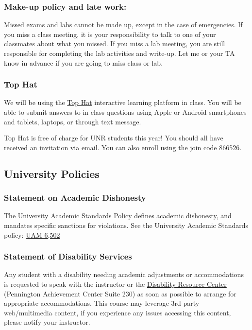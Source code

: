 \documentclass[
]{article}
\begin{document}
\subsubsection{Make-up policy and late
work:}\label{make-up-policy-and-late-work}

Missed exams and labs cannot be made up, except in the case of
emergencies. If you miss a class meeting, it is your responsibility to
talk to one of your classmates about what you missed. If you miss a lab
meeting, you are still responsible for completing the lab activities and
write-up. Let me or your TA know in advance if you are going to miss
class or lab.

\subsubsection{Top Hat}\label{top-hat}

We will be using the \href{https://tophat.com/}{Top Hat} interactive
learning platform in class. You will be able to submit answers to
in-class questions using Apple or Android smartphones and tablets,
laptops, or through text message.

Top Hat is free of charge for UNR students this year! You should all
have received an invitation via email. You can also enroll using the
join code 866526.

\subsection{University Policies}\label{university-policies}

\subsubsection{Statement on Academic
Dishonesty}\label{statement-on-academic-dishonesty}

The University Academic Standards Policy defines academic dishonesty,
and mandates specific sanctions for violations. See the University
Academic Standards policy:
\href{https://www.unr.edu/administrative-manual/6000-6999-curricula-teaching-research/6502-academic-standards}{UAM
6,502}

\subsubsection{Statement of Disability
Services}\label{statement-of-disability-services}

Any student with a disability needing academic adjustments or
accommodations is requested to speak with the instructor or the
\href{https://www.unr.edu/drc}{Disability Resource Center} (Pennington
Achievement Center Suite 230) as soon as possible to arrange for
appropriate accommodations. This course may leverage 3rd party
web/multimedia content, if you experience any issues accessing this
content, please notify your instructor.
\end{document}
